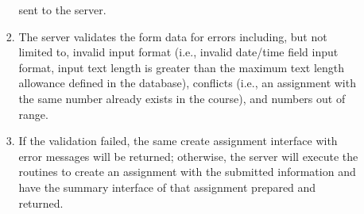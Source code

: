 \begin{enumerate}
\begin{itemize}
\begin{enumerate}
                sent to the server.
            \item The server validates the form data for errors including,
                but not limited to,
                invalid input format
                (i.e., invalid date/time field input format,
                input text length is greater than the maximum text length
                allowance defined in the database),
                conflicts (i.e., an assignment with the same
                number already exists in the course),
                and numbers out of range.
            \item If the validation failed, the same create assignment interface
                with error messages will be returned; otherwise, the server will
                execute the routines to create an assignment with the submitted
                information and have the summary interface of that assignment
                prepared and returned.
        \end{enumerate}
\end{itemize}


\end{enumerate}
